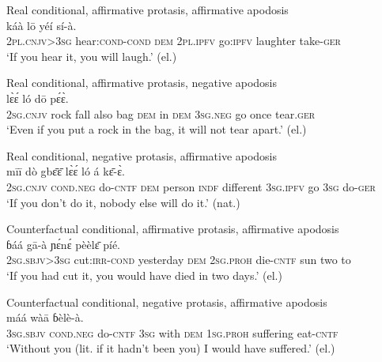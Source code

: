\documentclass[output=paper,colorlinks,citecolor=brown]{langscibook}
\begin{document}
\ea\label{ex:mano:65}Real conditional, affirmative protasis, affirmative apodosis\\
    \gll [ká mā-á ā] káà lō yéí sí-à. \\
         \textsc{2pl.cnjv>3sg} hear:\textsc{cond-cond} \textsc{dem} \textsc{2pl.ipfv} go:\textsc{ipfv} laughter take-\textsc{ger}\\
    \glt ‘If you hear it, you will laugh.’ (el.)
\z


\ea\label{ex:mano:66}Real conditional, affirmative protasis, negative apodosis\\
    \gll [í gɛ̄lɛ̀ dà bɛ̰̀ɛ̰̄ bɛ̀ɛ́ ā yí ā,] lɛ̀ɛ́ ló dō pɛ́ɛ̀. \\
         2\textsc{sg}.\textsc{cnjv} rock fall also bag \textsc{dem} in \textsc{dem} 3\textsc{sg}.\textsc{neg} go once tear.\textsc{ger}    \\
    \glt ‘Even if you put a rock in the bag, it will not tear apart.’ (el.)
\z

{
\ea\label{ex:mano:67}Real conditional, negative protasis, affirmative apodosis\\
    \gll [í gɔ̰̀á̰ kɛ̄-ɛ̀ ɛ̄] mīī dò gbɛ̄ɛ̄ lɛ̀ɛ́ ló á kɛ̄-ɛ̀. \\
         \textsc{2sg.cnjv} \textsc{cond.neg} do-\textsc{cntf} \textsc{dem} person \textsc{indf} different \textsc{3sg.ipfv} go \textsc{3sg} do-\textsc{ger}    \\
    \glt ‘If you don’t do it, nobody else will do it.’ (nat.)
\z}


\ea\label{ex:mano:68}Counterfactual conditional, affirmative protasis, affirmative apodosis\\
    \gll [ɓà kà̰-á̰ yālá ā] ɓáá gā-à ɲɛ́nɛ́ pèèlɛ̄ píé. \\
         2\textsc{sg.sbjv>3sg} cut:\textsc{irr{}-cond} yesterday \textsc{dem} \textsc{2sg.proh} die-\textsc{cntf} sun two to \\
    \glt ‘If you had cut it, you would have died in two days.’ (el.)
\z


\ea\label{ex:mano:69}Counterfactual conditional, negative protasis, affirmative apodosis\\
    \gll [è gɔ̰̀á̰ kɛ̄-ɛ̀ ī ká ā]  máá wàā ɓèlè-à. \\
         3\textsc{sg.sbjv} \textsc{cond.neg} do{}-\textsc{cntf} \textsc{3sg} with \textsc{dem} \textsc{1sg.proh} suffering eat-\textsc{cntf} \\
    \glt ‘Without you (lit. if it hadn’t been you) I would have suffered.’ (el.)
\z
\end{document}
